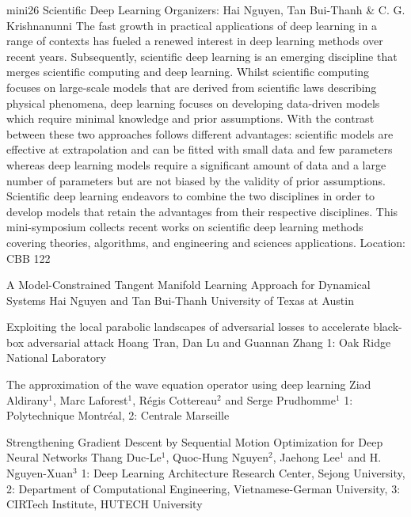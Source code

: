\mini
{mini26}
{Scientific Deep Learning}
{Organizers: Hai Nguyen, Tan Bui-Thanh \& C. G. Krishnanunni}
{The fast growth in practical applications of deep learning in a range of contexts has fueled a renewed interest in deep learning methods over recent years. Subsequently, scientific deep learning is an emerging discipline that merges scientific computing and deep learning. Whilst scientific computing focuses on large-scale models that are derived from scientific laws describing physical phenomena, deep learning focuses on developing data-driven models which require minimal knowledge and prior assumptions. With the contrast between these two approaches follows different advantages: scientific models are effective at extrapolation and can be fitted with small data and few parameters whereas deep learning models require a significant amount of data and a large number of parameters but are not biased by the validity of prior assumptions. Scientific deep learning endeavors to combine the two disciplines in order to develop models that retain the advantages from their respective disciplines. This mini-symposium collects recent works on scientific deep learning methods covering theories, algorithms, and engineering and sciences applications.}
{Location: CBB 122}

\begin{talks}
\item\talk
{A Model-Constrained Tangent Manifold Learning Approach for Dynamical Systems}
{Hai Nguyen and Tan Bui-Thanh}
{University of Texas at Austin}
\item\talk
{Exploiting the local parabolic landscapes of adversarial losses to accelerate black-box adversarial attack}
{Hoang Tran, Dan Lu and Guannan Zhang}
{1: Oak Ridge National Laboratory}
\item\talk
{The approximation of the wave equation operator using deep learning}
{Ziad Aldirany$^{1}$, Marc Laforest$^{1}$, Régis Cottereau$^2$ and Serge Prudhomme$^{1}$}
{1: Polytechnique Montréal, 2: Centrale Marseille}
\item\talk
{Strengthening Gradient Descent by Sequential Motion Optimization for Deep Neural Networks}
{Thang Duc-Le$^{1}$, Quoc-Hung Nguyen$^{2}$, Jaehong Lee$^{1}$ and H. Nguyen-Xuan$^{3}$}
{1: Deep Learning Architecture Research Center, Sejong University, 2: Department of Computational Engineering, Vietnamese-German University, 3: CIRTech Institute, HUTECH University}
\end{talks}
\room
